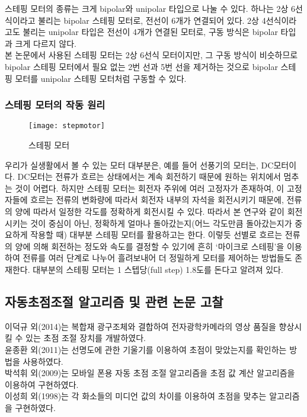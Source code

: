 스테핑 모터의 종류는 크게 bipolar와 unipolar 타입으로 나눌 수 있다. 하나는 2상 6선식이라고 불리는 bipolar 스테핑 모터로, 전선이 6개가 연결되어 있다. 2상 4선식이라고도 불리는 unipolar 타입은 전선이 4개가 연결된 모터로, 구동 방식은 bipolar 타입과 크게 다르지 않다.\\
본 논문에서 사용된 스테핑 모터는 2상 6선식 모터이지만, 그 구동 방식이 비슷하므로 bipolar 스테핑 모터에서 필요 없는 2번 선과 5번 선을 제거하는 것으로 bipolar 스테핑 모터를 unipolar 스테핑 모터처럼 구동할 수 있다.

\subsubsection{스테핑 모터의 작동 원리}

\begin{wrapfigure}{l}{0.5\textwidth}
	\texttt{[image: stepmotor]}
	\caption{스테핑 모터}
	\label{fig:stepmotor}
\end{wrapfigure}
우리가 실생활에서 볼 수 있는 모터 대부분은, 예를 들어 선풍기의 모터는, DC모터이다. DC모터는 전류가 흐르는 상태에서는 계속 회전하기 때문에 원하는 위치에서 멈추는 것이 어렵다. 하지만 스테핑 모터는 회전자 주위에 여러 고정자가 존재하여, 이 고정자들에 흐르는 전류의 변화량에 따라서 회전자 내부의 자석을 회전시키기 때문에, 전류의 양에 따라서 일정한 각도를 정확하게 회전시킬 수 있다. 따라서 본 연구와 같이 회전시키는 것이 중심이 아닌, 정확하게 얼마나 돌아갔는지(어느 각도만큼 돌아갔는지가 중요하게 작용할 때) 대부분 스테핑 모터를 활용하고는 한다. 이렇듯 선별로 흐르는 전류의 양에 의해 회전하는 정도와 속도를 결정할 수 있기에 흔히 ‘마이크로 스테핑’을 이용하여 전류를 여러 단계로 나누어 흘려보내어 더 정밀하게 모터를 제어하는 방법들도 존재한다. 대부분의 스테핑 모터는 1 스텝당(full step) 1.8도를 돈다고 알려져 있다.

\subsection{자동초점조절 알고리즘 및 관련 논문 고찰}

이덕규 외(2014)는 복합재 광구조체와 결합하여 전자광학카메라의 영상 품질을 향상시킬 수 있는 초점 조절 장치를 개발하였다.\cite{leedukgu2014}\\
윤종환 외(2011)는 선명도에 관한 기울기를 이용하여 초점이 맞았는지를 확인하는 방법을 사용하였다.\cite{yunjonghwan2011lcd}\\
박석휘 외(2009)는 모바일 폰용 자동 초점 조절 알고리즘을 초점 값 계산 알고리즘을 이용하여 구현하였다.\cite{parksukhui2009Median}\\
이성희 외(1998)는 각 화소들의 미디언 값의 차이를 이용하여 초점을 맞추는 알고리즘을 구현하였다.\cite{leeseonghee1998Median}
